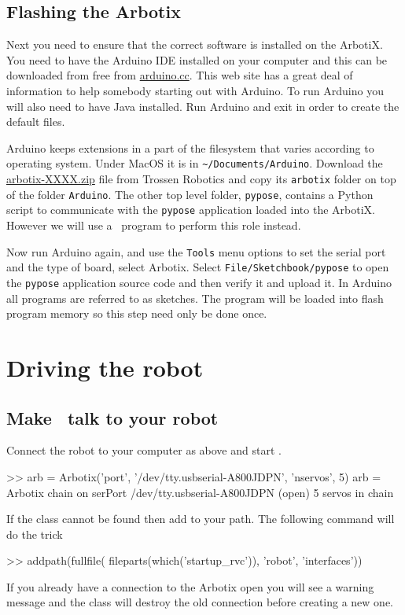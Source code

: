 \documentclass[11pt]{article}
\begin{document}
\subsection{Flashing the Arbotix}
Next you need to ensure that the correct software is installed on the ArbotiX.  You need to have the Arduino IDE installed on your computer and this can be downloaded from free from \href{http://arduino.cc}{arduino.cc}.  This web site has a great deal of information
to help somebody starting out with Arduino.  To run Arduino you will also need to have Java installed.  Run Arduino and exit in order to create the default files.

Arduino keeps extensions in a part of the filesystem that varies according to operating system.  Under MacOS it is in \texttt{\textasciitilde/Documents/Arduino}.  Download the \href{https://code.google.com/p/arbotix/}{arbotix-XXXX.zip} file from Trossen Robotics and copy its \texttt{arbotix} folder on top of  the  folder \texttt{Arduino}.  The other top level folder, \texttt{pypose}, contains a Python script to communicate with the \texttt{pypose} application loaded into the ArbotiX.  However we will use a \Mlab\ program to perform this role instead.

Now run Arduino again,  and use the \texttt{Tools} menu options to set the serial port and the type of board, select Arbotix.
Select \texttt{File/Sketchbook/pypose} to open the \texttt{pypose} application source code and then verify it and upload it.
In Arduino all programs are referred to as sketches.
The program will be loaded into flash program memory so this step need only be done once.


\section{Driving the robot}

\subsection{Make \Mlab\ talk to your robot}
Connect the robot to your computer as above and start \Mlab.
\begin{Code}
>> arb = Arbotix('port', '/dev/tty.usbserial-A800JDPN', 'nservos', 5)
arb = 
Arbotix chain on serPort /dev/tty.usbserial-A800JDPN (open)
 5 servos in chain                                         
 \end{Code}
If the class  cannot be found then add  to your path.  The following command will
do the trick
\begin{Code}
>> addpath(fullfile( fileparts(which('startup_rvc')), 'robot', 'interfaces'))
\end{Code}
If you already have a connection to the Arbotix open you will see a warning message and the class will destroy the old
connection before creating a new one.
\end{document}
